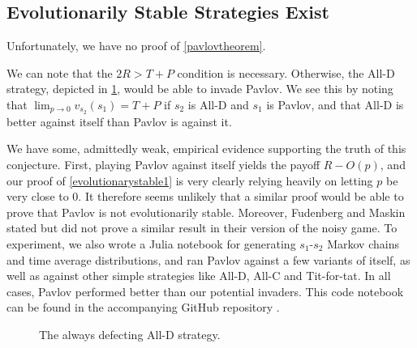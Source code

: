 \documentclass[12pt]{article}
\theoremstyle{definition}
\theoremstyle{remark}
\begin{document}



    \subsection{Evolutionarily Stable Strategies Exist}

    Unfortunately, we have no proof of \cref{pavlovtheorem}.

    We can note that the $2R > T + P$ condition is necessary. Otherwise, the All-D strategy, depicted in \cref{figurealld}, would be able to invade Pavlov. We see this by noting that $\lim_{p \to 0} v_{s_2}(s_1) = T + P$ if $s_2$ is All-D and $s_1$ is Pavlov, and that All-D is better against itself than Pavlov is against it.

    We have some, admittedly weak, empirical evidence supporting the truth of this conjecture. First, playing Pavlov against itself yields the payoff $R - O(p)$, and our proof of \cref{evolutionarystable1} is very clearly relying heavily on letting $p$ be very close to 0. It therefore seems unlikely that a similar proof would be able to prove that Pavlov is not evolutionarily stable. Moreover, Fudenberg and Maskin \cite{fundenberg1990evolution} stated but did not prove a similar result in their version of the noisy game. To experiment, we also wrote a Julia notebook for generating $s_1$-$s_2$ Markov chains and time average distributions, and ran Pavlov against a few variants of itself, as well as against other simple strategies like All-D, All-C and Tit-for-tat. In all cases, Pavlov performed better than our potential invaders. This code notebook can be found in the accompanying GitHub repository \cite{arvid2020}.

\begin{figure}
  \centering
  \caption{The always defecting All-D strategy.}
  \label{figurealld}
\end{figure}
\end{document}
